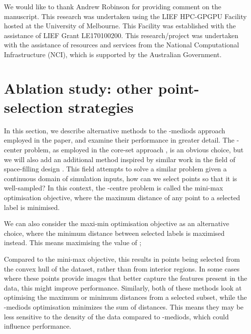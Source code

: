 \documentclass{article}
\begin{document}
We would like to thank Andrew Robinson for providing comment on the manuscript.
This research was undertaken using the LIEF HPC-GPGPU Facility hosted at the University of Melbourne. This Facility was established with the assistance of LIEF Grant LE170100200. 
This research/project was undertaken with the assistance of resources and services from the National Computational Infrastructure (NCI), which is supported by the Australian Government.





\vfill
\pagebreak
\appendix
\section{Ablation study: other point-selection strategies}
\label{sec:ablation_space_filling_design}

In this section, we describe alternative methods to the -mediods approach employed in the paper, and examine their performance in greater detail. The -center problem, as employed in the core-set approach \citep{sener2017active}, is an obvious choice, but we will also add an additional method inspired by similar work in the field of space-filling design \citep{pronzato2017minimax}. This field attempts to solve a similar problem \textemdash{} given a continuous domain of simulation inputs, how can we select points so that it is well-sampled? In this context, the -centre problem is called the mini-max optimisation objective, where the maximum distance of any point to a selected label is minimised.



We can also consider the maxi-min optimisation objective as an alternative choice, where the minimum distance between selected labels is maximised instead. This means maximising the value of ;



Compared to the mini-max objective, this results in points being selected from the convex hull of the dataset, rather than from interior regions. In some cases where these points provide images that better capture the features present in the data, this might improve performance. Similarly, both of these methods look at optimising the maximum or minimum distances from a selected subset, while the -mediods optimisation minimizes the sum of distances. This means they may be less sensitive to the density of the data compared to -mediods, which could influence performance.
\end{document}
